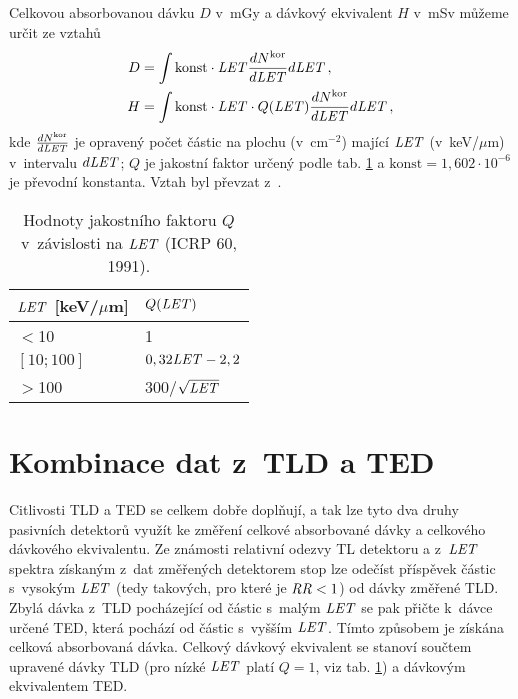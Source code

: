 Celkovou absorbovanou dávku $D$ v~mGy a dávkový ekvivalent $H$ v~mSv můžeme určit ze vztahů 
\begin{align}
  D&=\int\text{konst}\cdot\mathit{LET}\frac{dN^{\text{kor}}}{d\mathit{LET}}d\mathit{LET}\,,\label{eq:Davka}\\
  H&=\int\text{konst}\cdot\mathit{LET}\cdot Q(\mathit{LET})\frac{dN^{\text{kor}}}{d\mathit{LET}}d\mathit{LET}\,,\label{eq:EkvDavka}
\end{align}
kde $\frac{dN^{\text{kor}}}{d\mathit{LET}}$ je opravený počet částic na plochu (v~cm$^{-2}$) mající $\mathit{LET}$ (v~keV/$\mu$m) v~intervalu $d\mathit{LET}$; $Q$ je jakostní faktor určený podle tab. \ref{tab:detektory_Q} a $\text{konst}=1,602\cdot 10^{-6}$ je převodní konstanta. Vztah byl převzat z~\cite{thesisKPBrabcova}.

\begin{table}[H]
  \centering
  \caption{Hodnoty jakostního faktoru $Q$ v~závislosti na $\mathit{LET}$ (ICRP 60, 1991).}
  \label{tab:detektory_Q}
  \begin{tabular}{ll}
	\toprule
	$\mathit{LET}$ [keV/$\mu$m]&$Q(\mathit{LET})$ \\
	\midrule
$<$10&1\\
$[10;100]$&$0,32\mathit{LET}-2,2$\\
$>$100&300/$\sqrt{\mathit{LET}}$\\
	\bottomrule
  \end{tabular}
\end{table}
\section{Kombinace dat z~TLD a TED}\label{sec:detektory_kombinace}
Citlivosti TLD a TED se celkem dobře doplňují, a tak lze tyto dva druhy pasivních detektorů využít ke změření celkové absorbované dávky a celkového dávkového ekvivalentu. Ze známosti relativní odezvy TL detektoru a z~$\mathit{LET}$ spektra získaným z~dat změřených detektorem stop lze odečíst příspěvek částic s~vysokým $\mathit{LET}$ (tedy takových, pro které je $\mathit{RR}<1$) od dávky změřené TLD. Zbylá dávka z~TLD pocházející od částic s~malým $\mathit{LET}$ se pak přičte k~dávce určené TED, která pochází od částic s~vyšším $\mathit{LET}$. Tímto způsobem je získána celková absorbovaná dávka. Celkový dávkový ekvivalent se stanoví součtem upravené dávky TLD (pro nízké $\mathit{LET}$ platí $Q=1$, viz tab. \ref{tab:detektory_Q}) a dávkovým ekvivalentem TED.~\cite{dataTLD_RR}







